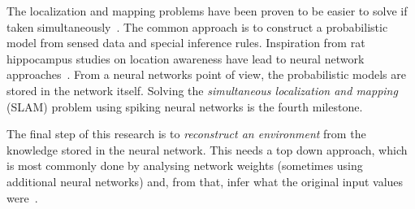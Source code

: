 The localization and mapping problems have been proven to be easier to solve if taken simultaneously~\cite{Durrant-Whyte2006-slam,Fuentes-Pacheco2012-slam}. The common approach is to construct a probabilistic model from sensed data and special inference rules. Inspiration from rat hippocampus studies on location awareness have lead to neural network approaches~\cite{rat-slam}. From a neural networks point of view, the probabilistic models are stored in the network itself. Solving the \emph{simultaneous localization and mapping} (SLAM) problem using spiking neural networks is the fourth milestone.

The final step of this research is to \emph{reconstruct an environment} from the knowledge stored in the neural network. This needs a top down approach, which is most commonly done by analysing network weights (sometimes using additional neural networks) and, from that, infer what the original input values were~\cite{Anh-Dung-deconv-nets}. 


